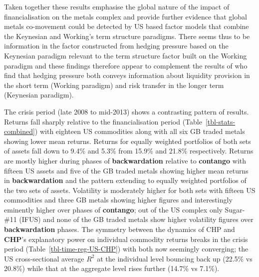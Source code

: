 \documentclass[
  authoryear,
  preprint,
  3p]{elsarticle}
\begin{document}
Taken together these results emphasise the global nature of the impact
of financialisation on the metals complex and provide further evidence
that global metals co-movement could be detected by US based factor
models that combine the Keynesian and Working's term structure
paradigms. There seems thus to be information in the factor constructed
from hedging pressure based on the Keynesian paradigm relevant to the
term structure factor built on the Working paradigm and these findings
therefore appear to complement the results of \citet{kang_tale_2020} who
find that hedging pressure both conveys information about liquidity
provision in the short term (Working paradigm) and risk transfer in the
longer term (Keynesian paradigm).

\bigskip
\bigskip

The crisis period (late 2008 to mid-2013) shows a contrasting pattern of
results. Returns fall sharply relative to the financialisation period
(Table~\ref{tbl-stats-combined}) with eighteen US commodities along with
all six GB traded metals showing lower mean returns. Returns for equally
weighted portfolios of both sets of assets fall down to 9.4\% and 5.3\%
from 15.9\% and 21.8\% respectively. Returns are mostly higher during
phases of \textbf{backwardation} relative to \textbf{contango} with
fifteen US assets and five of the GB traded metals showing higher mean
returns in \textbf{backwardation} and the pattern extending to equally
weighted portfolios of the two sets of assets. Volatility is moderately
higher for both sets with fifteen US commodities and three GB metals
showing higher figures and interestingly eminently higher over phases of
\textbf{contango}; out of the US complex only Sugar-\#11 (IFUS) and none
of the GB traded metals show higher volatility figures over
\textbf{backwardation} phases. The symmetry between the dynamics of CHP
and \textbf{CHP}'s explanatory power on individual commodity returns
breaks in the crisis period (Table~\ref{tbl-time-reg-US-CHP}) with both
now seemingly converging; the US cross-sectional average \(R^{2}\) at
the individual level bouncing back up (22.5\% vs 20.8\%) while that at
the aggregate level rises further (14.7\% vs 7.1\%).

\medskip
\end{document}
